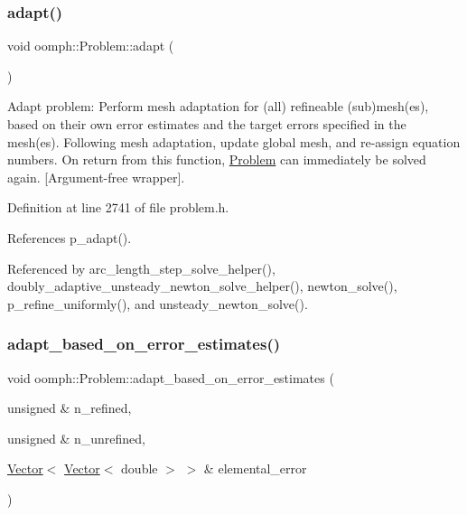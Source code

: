 \mbox{\label{classoomph_1_1Problem_a0b9e09ddfa2411f14fc723c3207decd1}} 
\subsubsection{\texorpdfstring{adapt()}{adapt()}\hspace{0.1cm}{\footnotesize\ttfamily [2/2]}}
{\footnotesize\ttfamily void oomph\+::\+Problem\+::adapt (\begin{DoxyParamCaption}{ }\end{DoxyParamCaption})\hspace{0.3cm}{\ttfamily [inline]}}



Adapt problem\+: Perform mesh adaptation for (all) refineable (sub)mesh(es), based on their own error estimates and the target errors specified in the mesh(es). Following mesh adaptation, update global mesh, and re-\/assign equation numbers. On return from this function, \hyperlink{classoomph_1_1Problem}{Problem} can immediately be solved again. \mbox{[}Argument-\/free wrapper\mbox{]}. 



Definition at line 2741 of file problem.\+h.



References p\+\_\+adapt().



Referenced by arc\+\_\+length\+\_\+step\+\_\+solve\+\_\+helper(), doubly\+\_\+adaptive\+\_\+unsteady\+\_\+newton\+\_\+solve\+\_\+helper(), newton\+\_\+solve(), p\+\_\+refine\+\_\+uniformly(), and unsteady\+\_\+newton\+\_\+solve().

\mbox{\label{classoomph_1_1Problem_a291f1a2b3cb65743355ec1e0cdcb7f48}} 
\subsubsection{\texorpdfstring{adapt\+\_\+based\+\_\+on\+\_\+error\+\_\+estimates()}{adapt\_based\_on\_error\_estimates()}\hspace{0.1cm}{\footnotesize\ttfamily [1/2]}}
{\footnotesize\ttfamily void oomph\+::\+Problem\+::adapt\+\_\+based\+\_\+on\+\_\+error\+\_\+estimates (\begin{DoxyParamCaption}\item[{unsigned \&}]{n\+\_\+refined,  }\item[{unsigned \&}]{n\+\_\+unrefined,  }\item[{\hyperlink{classoomph_1_1Vector}{Vector}$<$ \hyperlink{classoomph_1_1Vector}{Vector}$<$ double $>$ $>$ \&}]{elemental\+\_\+error }\end{DoxyParamCaption})}



